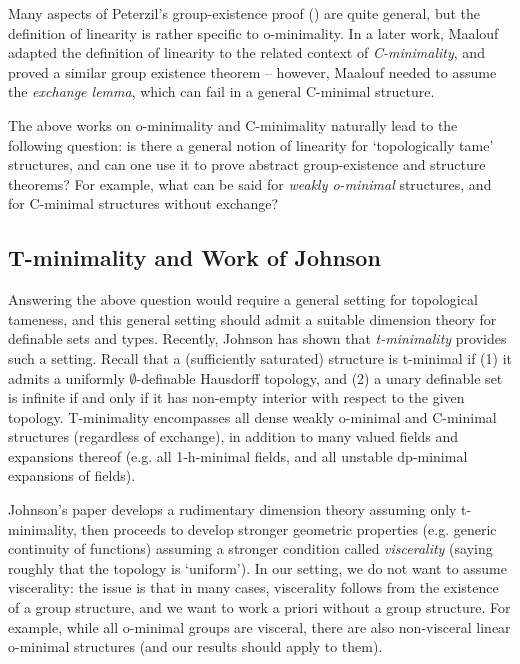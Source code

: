 \documentclass{amsart}
\theoremstyle{definition}
\begin{document}
Many aspects of Peterzil's group-existence proof (\cite{Pe}) are quite general, but the definition of linearity is rather specific to o-minimality. In a later work, Maalouf \cite{MaaCmin} adapted the definition of linearity to the related context of \textit{C-minimality}, and proved a similar group existence theorem -- however, Maalouf needed to assume the \textit{exchange lemma}, which can fail in a general C-minimal structure. 

The above works on o-minimality and C-minimality naturally lead to the following question: is there a general notion of linearity for `topologically tame' structures, and can one use it to prove abstract group-existence and structure theorems? For example, what can be said for \textit{weakly o-minimal} structures, and for C-minimal structures without exchange? 

\subsection{T-minimality and Work of Johnson}

Answering the above question would require a general setting for topological tameness, and this general setting should admit a suitable dimension theory for definable sets and types. Recently, Johnson \cite{t-minimal-johnson} has shown that \textit{t-minimality} provides such a setting. Recall that a (sufficiently saturated) structure is t-minimal if (1) it admits a uniformly $\emptyset$-definable Hausdorff topology, and (2) a unary definable set is infinite if and only if it has non-empty interior with respect to the given topology. T-minimality encompasses all dense weakly o-minimal and C-minimal structures (regardless of exchange), in addition to many valued fields and expansions thereof (e.g. all 1-h-minimal fields, and all unstable dp-minimal expansions of fields).

Johnson's paper develops a rudimentary dimension theory assuming only t-minimality, then proceeds to develop stronger geometric properties (e.g. generic continuity of functions) assuming a stronger condition called \textit{viscerality} (saying roughly that the topology is `uniform'). In our setting, we do not want to assume viscerality: the issue is that in many cases, viscerality follows from the existence of a group structure, and we want to work a priori without a group structure. For example, while all o-minimal groups are visceral, there are also non-visceral linear o-minimal structures (and our results should apply to them).
\end{document}
